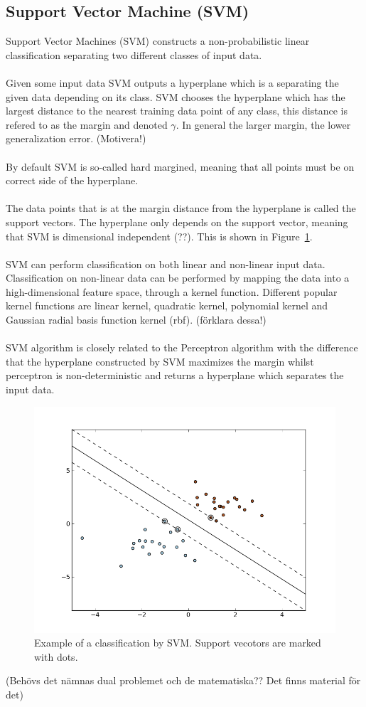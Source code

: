 \subsection{Support Vector Machine (SVM)}
Support Vector Machines (SVM) constructs a non-probabilistic linear classification separating two different classes of input data. 
\\\\
Given some input data SVM outputs a hyperplane which is a separating the given data depending on its class. SVM chooses the hyperplane which has the largest distance to the nearest training data point of any class, this distance is refered to as the margin and denoted $\gamma$. In general the larger margin, the lower generalization error. (Motivera!) 
\\\\
By default SVM is so-called hard margined, meaning that all points must be on correct side of the hyperplane. 
\\\\
The data points that is at the margin distance from the hyperplane is called the support vectors. The hyperplane only depends on the support vector, meaning that SVM is dimensional independent (??). This is shown in Figure~\ref{fig:svm}.
\\\\
SVM can perform classification on both linear and non-linear input data. Classification on non-linear data can be performed by mapping the data into a high-dimensional feature space, through a kernel function. Different popular kernel functions are linear kernel, quadratic kernel, polynomial kernel and Gaussian radial basis function kernel (rbf). (förklara dessa!)
\\\\
SVM algorithm is closely related to the Perceptron algorithm with the difference that the hyperplane constructed by SVM maximizes the margin whilst perceptron is non-deterministic and returns a hyperplane which separates the input data. 
\begin{figure}[h!]
\centering
\includegraphics[scale = 0.5]{fig/svm_example_stolen.png}
\caption{Example of a classification by SVM. Support vecotors are marked with dots. \citep{svm_picture}}
\label{fig:svm}
\end{figure}
(Behövs det nämnas dual problemet och de matematiska?? Det finns material för det) 
